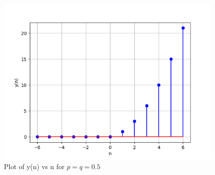 \documentclass[journal,12pt,twocolumn]{IEEEtran}
\theoremstyle{remark}
\begin{document}
\begin{figure}[!h]
    \centering
    \includegraphics[width = \columnwidth]{figs/y_plot.png}
    \caption{Plot of y(n) vs n for $p=q=0.5$}
    \label{fig:2}
\end{figure}
\end{document}
